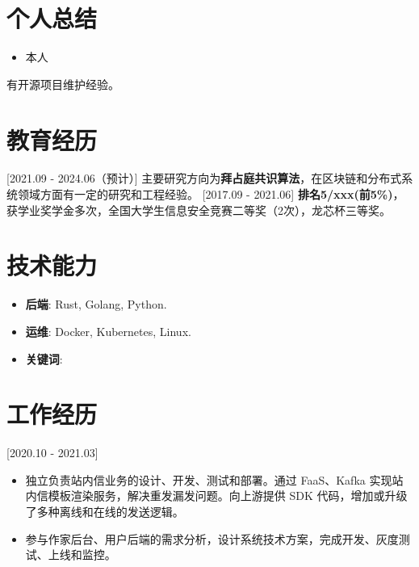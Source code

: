 \documentclass{resume}
\begin{document}

\ResumeTitle

\section{个人总结}

\begin{itemize}
  \item 本人
\end{itemize}

有开源项目维护经验。

\section{教育经历}
[2021.09 - 2024.06（预计）]
主要研究方向为\textbf{拜占庭共识算法}，在区块链和分布式系统领域方面有一定的研究和工程经验。
[2017.09 - 2021.06]
\textbf{排名5/xxx(前5\%)}，获学业奖学金多次，全国大学生信息安全竞赛二等奖（2次），龙芯杯三等奖。


\section{技术能力}
\begin{itemize}
  \item \textbf{后端}: Rust, Golang, Python.
  \item \textbf{运维}: Docker, Kubernetes, Linux.
  \item \textbf{关键词}: 
\end{itemize}

\section{工作经历}

[2020.10 - 2021.03] 
\begin{itemize}
  \item 独立负责站内信业务的设计、开发、测试和部署。通过 FaaS、Kafka 实现站内信模板渲染服务，解决重发漏发问题。向上游提供 SDK 代码，增加或升级了多种离线和在线的发送逻辑。
  \item 参与作家后台、用户后端的需求分析，设计系统技术方案，完成开发、灰度测试、上线和监控。
\end{itemize}
\end{document}
